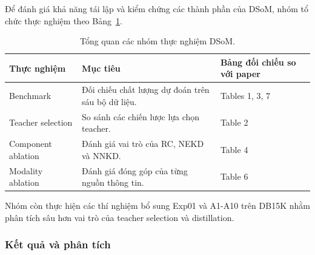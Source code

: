 Để đánh giá khả năng tái lập và kiểm chứng
các thành phần của DSoM, nhóm tổ chức
thực nghiệm theo Bảng~\ref{tab:dsom_exp_overview}.

\begin{table}[htbp]
\centering
\caption{Tổng quan các nhóm thực nghiệm DSoM.}
\label{tab:dsom_exp_overview}
\scriptsize
\setlength{\tabcolsep}{3pt}
\renewcommand{\arraystretch}{1.2}

\begin{tabular}{@{}
>{\raggedright\arraybackslash}p{}
>{\raggedright\arraybackslash}p{}
>{\raggedright\arraybackslash}p{}@{}}

\toprule
\textbf{Thực nghiệm}
& \textbf{Mục tiêu}
& \textbf{Bảng đối chiếu so với paper} \\
\midrule

Benchmark
& Đối chiếu chất lượng dự đoán trên
sáu bộ dữ liệu.
& Tables 1, 3, 7 \\

\addlinespace
Teacher selection
& So sánh các chiến lược
lựa chọn teacher.
& Table 2 \\

\addlinespace
Component ablation
& Đánh giá vai trò của RC,
NEKD và NNKD.
& Table 4 \\

\addlinespace
Modality ablation
& Đánh giá đóng góp của từng
nguồn thông tin.
& Table 6 \\


\bottomrule
\end{tabular}
\end{table}




Nhóm còn thực hiện các thí nghiệm bổ sung
Exp01 và A1-A10 trên DB15K nhằm phân tích
sâu hơn vai trò của teacher selection và
distillation.


\providecommand{\dsomrunbase}{https://forge.coreweave.com/wandb/keiranoluv-hcmus/DSoM-Reproduction/runs/}
\providecommand{\dsomreprocell}[1]{\cellcolor{resultgray}#1}
\providecommand{\dsomrun}[2]{\cellcolor{resultgray}\href{\dsomrunbase#1}{#2}}
\providecommand{\dsomsource}[2]{\cellcolor{resultgray}\href{\dsomrunbase#1}{#2}\textsuperscript{\textdagger}}
\providecommand{\dsomlink}[2]{\href{\dsomrunbase#1}{#2}}
\providecommand{\deltaneg}[1]{\textcolor{red!70!black}{#1}}
\providecommand{\deltapos}[1]{\textcolor{green!45!black}{#1}}



\subsubsection{Kết quả và phân tích}

